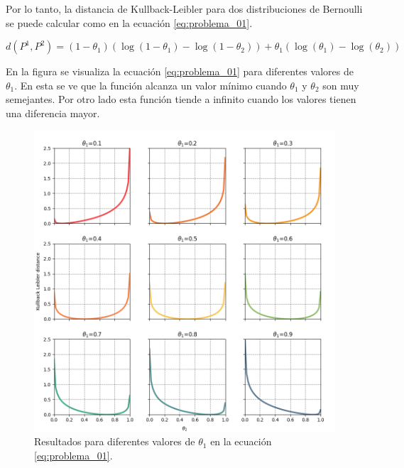 Por lo tanto, la distancia de Kullback-Leibler para dos distribuciones de Bernoulli se puede calcular como en la ecuación \ref{eq:problema_01}.

\begin{equation}
    d(P^1,P^2)  = (1-\theta_1) \left ( \log (1-\theta_1)- \log (1-\theta_2)\right ) + \theta_1 \left (\log (\theta_1)-\log (\theta_2) \right ) \label{eq:problema_01}
\end{equation}

En la figura se visualiza la ecuación \ref{eq:problema_01} para diferentes valores de $\theta_1$. En esta se ve que la función alcanza un valor mínimo cuando $\theta_1$ y $\theta_2$ son muy semejantes. Por otro lado esta función tiende a infinito cuando los valores tienen una diferencia mayor.

\begin{figure}[H]
    \centering
    \includegraphics[width=14cm]{Graphics/Kullback.png}
    \caption{Resultados para diferentes valores de $\theta_1$ en la ecuación \ref{eq:problema_01}.}
\end{figure}
